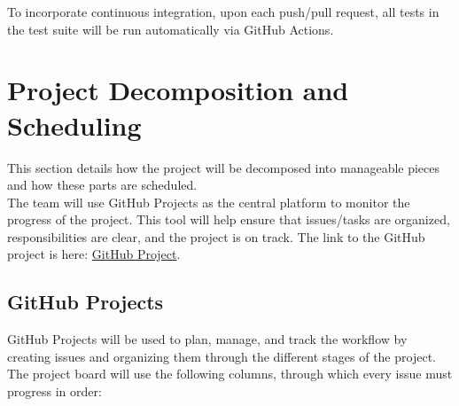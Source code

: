 \documentclass{article}
\begin{document}
To incorporate continuous integration, upon each push/pull request, all tests in the test suite will be run automatically via GitHub Actions.

\section{Project Decomposition and Scheduling}

This section details how the project will be decomposed into manageable pieces and how these parts are scheduled.\\

The team will use GitHub Projects as the central platform to monitor the progress of the project. This tool will help ensure that issues/tasks are organized, responsibilities are clear, and the project is on track. The link to the GitHub project is here: \href{https://github.com/users/OmarHassanAdelhamid/projects/2/views/1}{GitHub Project}.

\subsection{GitHub Projects}

GitHub Projects will be used to plan, manage, and track the workflow by creating issues and
organizing them through the different stages of the project. The project board will use the
following columns, through which every issue must progress in order:
\end{document}
